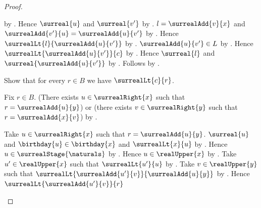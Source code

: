 \begin{proof}
\begin{subproof}
\begin{byCase}
                    by .
                Hence $\surreal{u}$ and $\surreal{v'}$
                    by
                    .
                $l=\surrealAdd{v}{x}$ and
                    $\surrealAdd{v'}{u}=\surrealAdd{u}{v'}$
                    by
                    .
                Hence $\surrealLt{l}{\surrealAdd{u}{v'}}$
                    by \auto.
                $\surrealAdd{u}{v'}\in L$
                    by .
                Hence $\surrealLt{\surrealAdd{u}{v'}}{c}$
                    by .
                Hence $\surreal{l}$ and
                    $\surreal{\surrealAdd{u}{v'}}$
                    by
                    .
                Follows by
                    .
        \end{byCase}
    \end{subproof}
    Show that for every $r\in B$ we have $\surrealLt{c}{r}$.
    \begin{subproof}
        Fix $r\in B$.
        (There exists $u\in\surrealRight{x}$ such that
            $r=\surrealAdd{u}{y}$) or
        (there exists $v\in\surrealRight{y}$ such that
            $r=\surrealAdd{x}{v}$)
            by .
        \begin{byCase}
                Take $u\in\surrealRight{x}$ such that
                    $r=\surrealAdd{u}{y}$.
                $\surreal{u}$ and $\birthday{u}\in\birthday{x}$ and
                    $\surrealLt{x}{u}$
                    by .
                Hence $u\in\surrealStage{\naturals}$
                    by .
                Hence $u\in\realUpper{x}$
                    by .
                Take $u'\in\realUpper{x}$ such that
                    $\surrealLt{u'}{u}$
                    by .
                Take $v\in\realUpper{y}$ such that
                    $\surrealLt{\surrealAdd{u'}{v}}
                        {\surrealAdd{u}{y}}$
                    by .
                Hence $\surrealLt{\surrealAdd{u'}{v}}{r}$

\end{byCase}
\end{subproof}
\end{proof}
